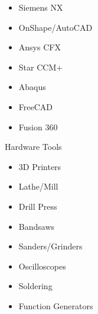 \begin{minipage}{\dimexpr\textwidth-2ex}
\begin{multicols}{5}
\begin{itemize}[topsep=3pt,label=\textcolor{blue}{\textbullet},leftmargin=*]
        \item Siemens NX
        \item OnShape/AutoCAD
        \item Ansys CFX
        \item Star CCM+
        \item Abaqus
        \item FreeCAD
        \item Fusion 360
    \end{itemize}
    \columnbreak
    {\color{cblue} Hardware Tools}
    \begin{itemize}[topsep=3pt,label=\textcolor{blue}{\textbullet},leftmargin=*]
        \itemsep-0.2em 
        \item 3D Printers
        \item Lathe/Mill
        \item Drill Press
        \item Bandsaws
        \item Sanders/Grinders
        \item Oscilloscopes
        \item Soldering
        \item Function Generators
    \end{itemize}

\end{multicols}


\end{minipage}